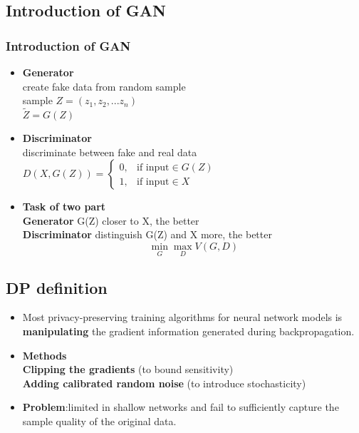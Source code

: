 \documentclass{beamer}
\begin{document}
\subsection{Introduction of GAN}
\begin{frame}
    \frametitle{Introduction of GAN}
    \begin{itemize}
        \item \textbf{Generator}\\[5pt]
        create fake data from random sample\\
        sample $Z = (z_1,z_2,...z_n)$\\
        $\tilde{Z} = G(Z)$\\
        \item \textbf{Discriminator}\\[5pt]
        discriminate between fake and real data\\
        $D(X, G(Z)) = \begin{cases}
                      0, & \mbox{if input} \in G(Z)\\
                      1, & \mbox{if input} \in X
                      \end{cases}$
        \item \textbf{Task of two part}\\[5pt]
        \textbf{Generator}
        G(Z) closer to X, the better\\
        \textbf{Discriminator}
        distinguish G(Z) and X more, the better\\
        {$$\mathop{\min}\limits_{G}\mathop{\max}\limits_{D} V(G,D)$$}
    \end{itemize}
\end{frame}

\subsection{DP definition}
\begin{frame}
    \begin{itemize}
    \item Most privacy-preserving training algorithms for neural network models is \textbf{manipulating}
  the gradient information generated during backpropagation.
    \item \textbf{Methods}\\
      \textbf{Clipping the gradients} (to bound sensitivity)\\
      \textbf{Adding calibrated random noise} (to introduce stochasticity)
    \item \textbf{Problem}:limited in shallow networks and fail to sufficiently capture the sample quality of the
  original data.

  \end{itemize} 
\end{frame}
\end{document}

